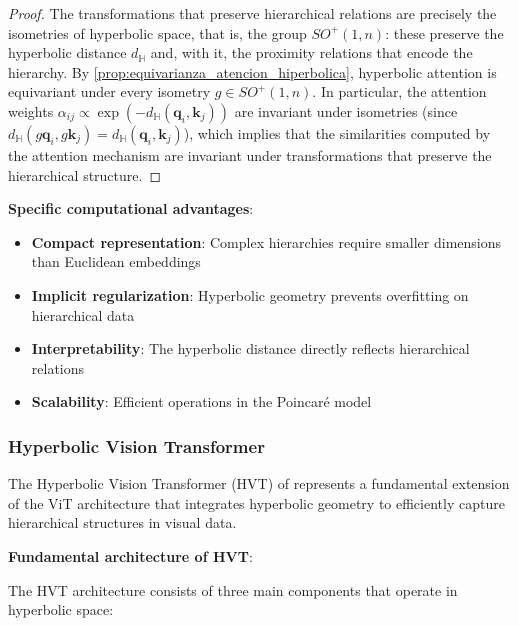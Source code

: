\begin{proof}
The transformations that preserve hierarchical relations are precisely the isometries of hyperbolic space, that is, the group $SO^+(1,n)$: these preserve the hyperbolic distance $d_{\mathbb{H}}$ and, with it, the proximity relations that encode the hierarchy. By \autoref{prop:equivarianza_atencion_hiperbolica}, hyperbolic attention is equivariant under every isometry $g \in SO^+(1,n)$. In particular, the attention weights $\alpha_{ij} \propto \exp(-d_{\mathbb{H}}(\mathbf{q}_i, \mathbf{k}_j))$ are invariant under isometries (since $d_{\mathbb{H}}(g\mathbf{q}_i, g\mathbf{k}_j) = d_{\mathbb{H}}(\mathbf{q}_i, \mathbf{k}_j)$), which implies that the similarities computed by the attention mechanism are invariant under transformations that preserve the hierarchical structure.
\end{proof}

\textbf{Specific computational advantages}:

\begin{itemize}
    \item \textbf{Compact representation}: Complex hierarchies require smaller dimensions than Euclidean embeddings
    \item \textbf{Implicit regularization}: Hyperbolic geometry prevents overfitting on hierarchical data
    \item \textbf{Interpretability}: The hyperbolic distance directly reflects hierarchical relations
    \item \textbf{Scalability}: Efficient operations in the Poincaré model
\end{itemize}

\subsubsection{Hyperbolic Vision \gls{Transformer}}

The Hyperbolic Vision Transformer (HVT) of \citet{hvt2024hyperbolic} represents a fundamental extension of the \gls{ViT} architecture that integrates hyperbolic geometry to efficiently capture hierarchical structures in visual data.

\textbf{Fundamental architecture of HVT}:

The HVT architecture consists of three main components that operate in hyperbolic space:

